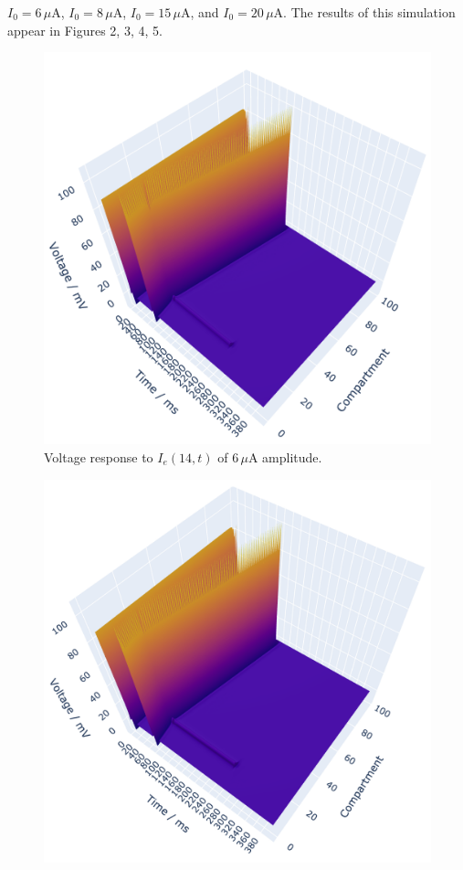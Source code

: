 \documentclass[12pt]{article}
\begin{document}
\begin{enumerate}
    $I_{0}=6 \, \mu \text{A}$, $I_{0}=8 \, \mu \text{A}$, $I_{0}=15 \, \mu \text{A}$, and $I_{0}=20 \, \mu \text{A}$.
    The results of this simulation appear in Figures 2, 3, 4, 5.
    \begin{figure}[h]
        \centering
        \includegraphics[width=1\textwidth]{6A.png}
        \caption{Voltage response to $I_{e}(14,t)$ of $6 \, \mu \text{A}$ amplitude.}
    \end{figure}
    \begin{figure}[h]
        \centering
        \includegraphics[width=1\textwidth]{8A.png}

\end{figure}
\end{enumerate}
\end{document}
